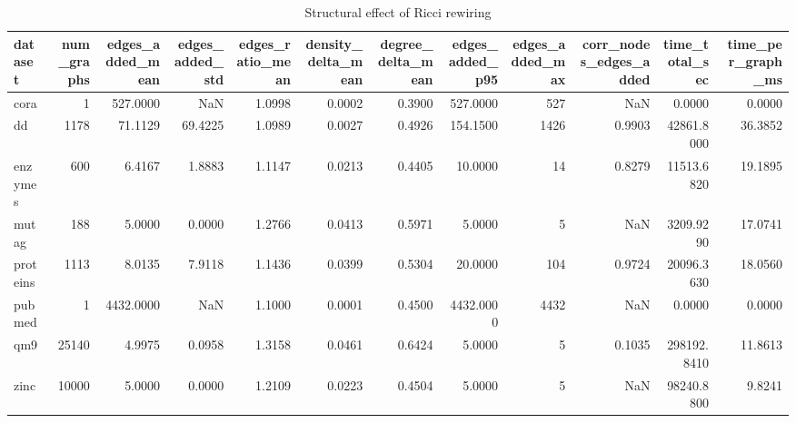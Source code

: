 \begin{table}
\caption{Structural effect of Ricci rewiring}
\label{tab:rewiring_summary}
\begin{tabular}{lrrrrrrrrrrr}
\toprule
dataset & num_graphs & edges_added_mean & edges_added_std & edges_ratio_mean & density_delta_mean & degree_delta_mean & edges_added_p95 & edges_added_max & corr_nodes_edges_added & time_total_sec & time_per_graph_ms \\
\midrule
cora & 1 & 527.0000 & NaN & 1.0998 & 0.0002 & 0.3900 & 527.0000 & 527 & NaN & 0.0000 & 0.0000 \\
dd & 1178 & 71.1129 & 69.4225 & 1.0989 & 0.0027 & 0.4926 & 154.1500 & 1426 & 0.9903 & 42861.8000 & 36.3852 \\
enzymes & 600 & 6.4167 & 1.8883 & 1.1147 & 0.0213 & 0.4405 & 10.0000 & 14 & 0.8279 & 11513.6820 & 19.1895 \\
mutag & 188 & 5.0000 & 0.0000 & 1.2766 & 0.0413 & 0.5971 & 5.0000 & 5 & NaN & 3209.9290 & 17.0741 \\
proteins & 1113 & 8.0135 & 7.9118 & 1.1436 & 0.0399 & 0.5304 & 20.0000 & 104 & 0.9724 & 20096.3630 & 18.0560 \\
pubmed & 1 & 4432.0000 & NaN & 1.1000 & 0.0001 & 0.4500 & 4432.0000 & 4432 & NaN & 0.0000 & 0.0000 \\
qm9 & 25140 & 4.9975 & 0.0958 & 1.3158 & 0.0461 & 0.6424 & 5.0000 & 5 & 0.1035 & 298192.8410 & 11.8613 \\
zinc & 10000 & 5.0000 & 0.0000 & 1.2109 & 0.0223 & 0.4504 & 5.0000 & 5 & NaN & 98240.8800 & 9.8241 \\
\bottomrule
\end{tabular}
\end{table}
